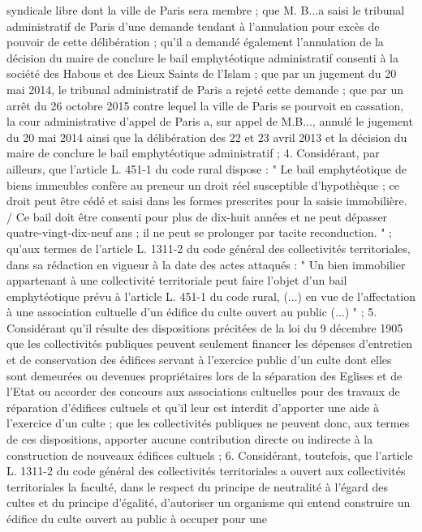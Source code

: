 \documentclass[11pt,a4paper]{report}
\begin{document}
syndicale libre dont la ville de Paris sera membre ; que M. B...a saisi le tribunal administratif de Paris d'une
demande tendant à l'annulation pour excès de pouvoir de cette délibération ; qu'il a demandé également
l'annulation de la décision du maire de conclure le bail emphytéotique administratif consenti à la société des
Habous et des Lieux Saints de l'Islam ; que par un jugement du 20 mai 2014, le tribunal administratif de Paris a
rejeté cette demande ; que par un arrêt du 26 octobre 2015 contre lequel la ville de Paris se pourvoit en
cassation, la cour administrative d'appel de Paris a, sur appel de M.B..., annulé le jugement du 20 mai 2014
ainsi que la délibération des 22 et 23 avril 2013 et la décision du maire de conclure le bail emphytéotique
administratif ;
4. Considérant, par ailleurs, que l'article L. 451-1 du code rural dispose : " Le bail emphytéotique de biens
immeubles confère au preneur un droit réel susceptible d'hypothèque ; ce droit peut être cédé et saisi dans les
formes prescrites pour la saisie immobilière. / Ce bail doit être consenti pour plus de dix-huit années et ne peut
dépasser quatre-vingt-dix-neuf ans ; il ne peut se prolonger par tacite reconduction. " ; qu'aux termes de
l'article L. 1311-2 du code général des collectivités territoriales, dans sa rédaction en vigueur à la date des
actes attaqués : " Un bien immobilier appartenant à une collectivité territoriale peut faire l'objet d'un bail
emphytéotique prévu à l'article L. 451-1 du code rural, (...) en vue de l'affectation à une association cultuelle
d'un édifice du culte ouvert au public (...) " ;
5. Considérant qu'il résulte des dispositions précitées de la loi du 9 décembre 1905 que les collectivités
publiques peuvent seulement financer les dépenses d'entretien et de conservation des édifices servant à l'exercice
public d'un culte dont elles sont demeurées ou devenues propriétaires lors de la séparation des Eglises et de
l'Etat ou accorder des concours aux associations cultuelles pour des travaux de réparation d'édifices cultuels et
qu'il leur est interdit d'apporter une aide à l'exercice d'un culte ; que les collectivités publiques ne peuvent donc,
aux termes de ces dispositions, apporter aucune contribution directe ou indirecte à la construction de nouveaux
édifices cultuels ;
6. Considérant, toutefois, que l'article L. 1311-2 du code général des collectivités territoriales a ouvert aux
collectivités territoriales la faculté, dans le respect du principe de neutralité à l'égard des cultes et du principe
d'égalité, d'autoriser un organisme qui entend construire un édifice du culte ouvert au public à occuper pour une
\end{document}
